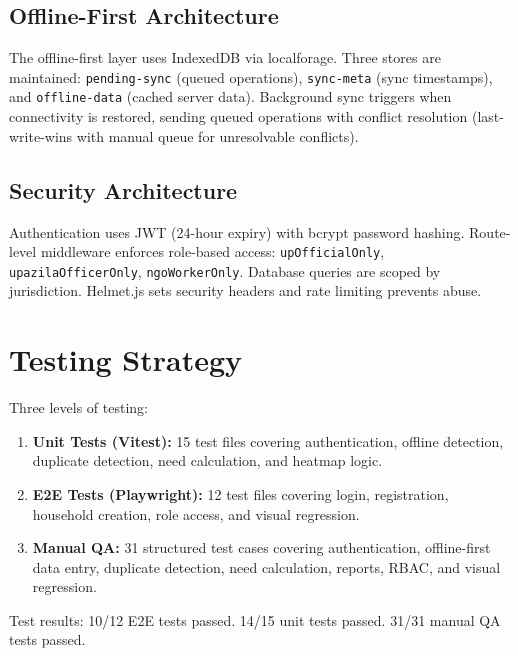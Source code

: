 \subsection{Offline-First Architecture}
The offline-first layer uses IndexedDB via localforage. Three stores are maintained: \texttt{pending-sync} (queued operations), \texttt{sync-meta} (sync timestamps), and \texttt{offline-data} (cached server data). Background sync triggers when connectivity is restored, sending queued operations with conflict resolution (last-write-wins with manual queue for unresolvable conflicts).

\subsection{Security Architecture}
Authentication uses JWT (24-hour expiry) with bcrypt password hashing. Route-level middleware enforces role-based access: \texttt{upOfficialOnly}, \texttt{upazilaOfficerOnly}, \texttt{ngoWorkerOnly}. Database queries are scoped by jurisdiction. Helmet.js sets security headers and rate limiting prevents abuse.

\section{Testing Strategy}

Three levels of testing:
\begin{enumerate}
    \item \textbf{Unit Tests (Vitest):} 15 test files covering authentication, offline detection, duplicate detection, need calculation, and heatmap logic.
    \item \textbf{E2E Tests (Playwright):} 12 test files covering login, registration, household creation, role access, and visual regression.
    \item \textbf{Manual QA:} 31 structured test cases covering authentication, offline-first data entry, duplicate detection, need calculation, reports, RBAC, and visual regression.
\end{enumerate}

Test results: 10/12 E2E tests passed. 14/15 unit tests passed. 31/31 manual QA tests passed.
